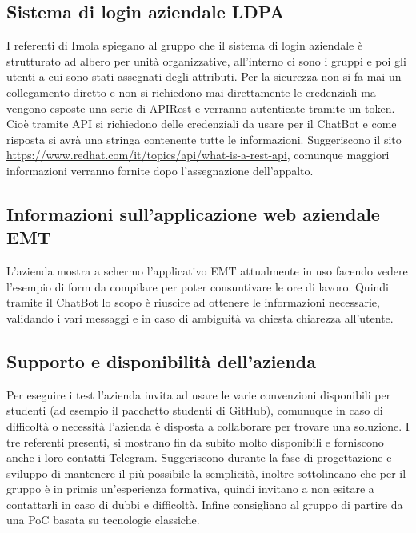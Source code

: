 \subsection{Sistema di login aziendale LDPA}
I referenti di Imola spiegano al gruppo che il sistema di login aziendale è strutturato ad albero 
per unità organizzative, all'interno ci sono i gruppi e poi gli utenti a cui sono stati assegnati degli attributi. 
Per la sicurezza non si fa mai un collegamento diretto e non si richiedono mai direttamente le credenziali
ma vengono esposte una serie di APIRest e verranno autenticate tramite un token. 
Cioè tramite API si richiedono delle credenziali da usare per il ChatBot e come risposta si avrà 
una stringa contenente tutte le informazioni. Suggeriscono il sito 
\href{https://www.redhat.com/it/topics/api/what-is-a-rest-api}{https://www.redhat.com/it/topics/api/what-is-a-rest-api},
comunque maggiori informazioni verranno fornite dopo l'assegnazione dell'appalto.

\subsection{Informazioni sull'applicazione web aziendale EMT}
L'azienda mostra a schermo l'applicativo EMT attualmente in uso facendo vedere l'esempio di form 
da compilare per poter consuntivare le ore di lavoro. Quindi tramite il ChatBot lo scopo è riuscire 
ad ottenere le informazioni necessarie, validando i vari messaggi e in caso di ambiguità va chiesta
chiarezza all'utente.

\subsection{Supporto e disponibilità dell'azienda}
Per eseguire i test l'azienda invita ad usare le varie convenzioni disponibili per studenti 
(ad esempio il pacchetto studenti di GitHub), comunuque in caso di difficoltà o necessità 
l'azienda è disposta a collaborare per trovare una soluzione.
I tre referenti presenti, si mostrano fin da subito molto disponibili e forniscono
anche i loro contatti Telegram. \newline
Suggeriscono durante la fase di progettazione e sviluppo di mantenere il più possibile 
la semplicità, inoltre sottolineano che per il gruppo è in primis un'esperienza formativa, 
quindi invitano a non esitare a contattarli in caso di dubbi e difficoltà. 
Infine consigliano al gruppo di partire da una PoC basata su tecnologie classiche.

